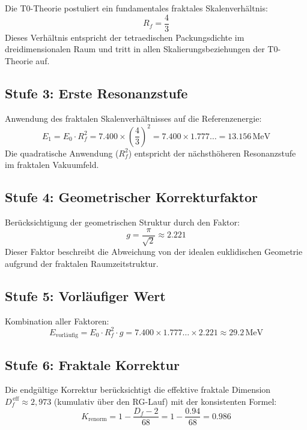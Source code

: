 	Die T0-Theorie postuliert ein fundamentales fraktales Skalenverhältnis:
	\begin{equation}
		R_f = \frac{4}{3}
	\end{equation}
	Dieses Verhältnis entspricht der tetraedischen Packungsdichte im dreidimensionalen Raum und tritt in allen Skalierungsbeziehungen der T0-Theorie auf.
	
	\subsection{Stufe 3: Erste Resonanzstufe}
	
	Anwendung des fraktalen Skalenverhältnisses auf die Referenzenergie:
	\begin{equation}
		E_1 = E_0 \cdot R_f^2 = 7.400 \times \left(\frac{4}{3}\right)^2 = 7.400 \times 1.777\ldots = 13.156\,\text{MeV}
	\end{equation}
	Die quadratische Anwendung ($R_f^2$) entspricht der nächsthöheren Resonanzstufe im fraktalen Vakuumfeld.
	
	\subsection{Stufe 4: Geometrischer Korrekturfaktor}
	
	Berücksichtigung der geometrischen Struktur durch den Faktor:
	\begin{equation}
		g = \frac{\pi}{\sqrt{2}} \approx 2.221
	\end{equation}
	Dieser Faktor beschreibt die Abweichung von der idealen euklidischen Geometrie aufgrund der fraktalen Raumzeitstruktur.
	
	\subsection{Stufe 5: Vorläufiger Wert}
	
	Kombination aller Faktoren:
	\begin{equation}
		E_{\text{vorläufig}} = E_0 \cdot R_f^2 \cdot g = 7.400 \times 1.777\ldots \times 2.221 \approx 29.2\,\text{MeV}
	\end{equation}
	
	\subsection{Stufe 6: Fraktale Korrektur}
	
	Die endgültige Korrektur berücksichtigt die effektive fraktale Dimension $D_f^{\,\text{eff}} \approx 2{,}973$ (kumulativ über den RG-Lauf) mit der konsistenten Formel:
	\begin{equation}
		K_{\text{renorm}} = 1 - \frac{D_f - 2}{68} = 1 - \frac{0.94}{68} = 0.986
	\end{equation}
	
